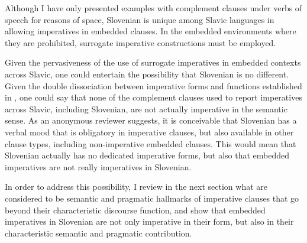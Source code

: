 \documentclass[output=paper,colorlinks,citecolor=brown]{langscibook}
\begin{document}
\noindent Although I have only presented examples with complement clauses under verbs of speech for reasons of space, Slovenian is unique among Slavic languages in allowing imperatives in embedded clauses. In the embedded environments where they are prohibited, surrogate imperative constructions must be employed.

Given the pervasiveness of the use of surrogate imperatives in embedded contexts across Slavic, one could entertain the possibility that Slovenian is no different. Given the double dissociation between imperative forms and functions established in , one could say that none of the complement clauses used to report imperatives across Slavic, including Slovenian, are not actually imperative in the semantic sense. As an anonymous reviewer suggests, it is conceivable that Slovenian has a verbal mood that is obligatory in imperative clauses, but also available in other clause types, including non-imperative embedded clauses. This would mean that Slovenian actually has no dedicated imperative forms, but also that embedded imperatives are not really imperatives in Slovenian. 

In order to address this possibility, I review in the next section what are considered to be semantic and pragmatic hallmarks of imperative clauses that go beyond their characteristic discourse function, and show that embedded imperatives in Slovenian are not only imperative in their form, but also in their characteristic semantic and pragmatic contribution.
\end{document}
